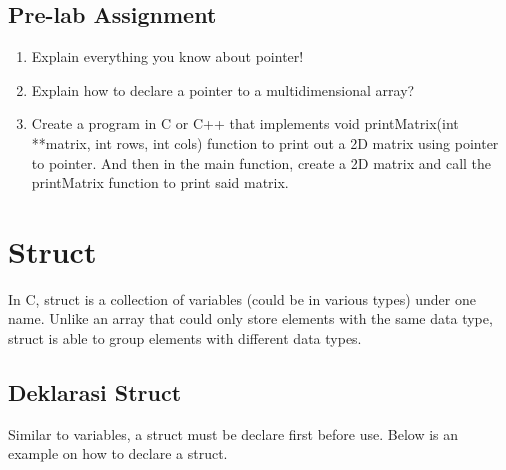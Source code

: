 \subsection{Pre-lab Assignment}
\begin{enumerate}
    \item Explain everything you know about pointer!
    \item Explain how to declare a pointer to a multidimensional array?
    \item Create a program in C or C++ that implements void printMatrix(int **matrix, int rows, int cols) function
          to print out a 2D matrix using pointer to pointer. And then in the main function, create a 2D matrix and call the
          printMatrix function to print said matrix.
\end{enumerate}

\section{Struct}
In C, struct is a collection of variables (could be in various types) under one name. Unlike an array that could only
store elements with the same data type, struct is able to group elements with different data types.

\subsection{Deklarasi Struct}
Similar to variables, a struct must be declare first before use. Below is an example on how to declare a struct.

